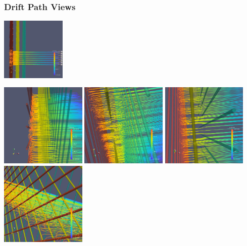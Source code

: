 \documentclass[xcolor=dvipsnames]{beamer}
\begin{document}
\begin{frame}
  \frametitle{Drift Path Views}
  \begin{center}
    
  \includegraphics[height=3cm,clip,trim=0cm 5cm 0cm 17cm]{steps/upaths1.png}

  \includegraphics[height=4cm,clip,trim=10cm 0cm 10cm 0cm]{steps/upaths8.png}
  \includegraphics[height=4cm,clip,trim=4cm 0cm 10cm 0cm]{steps/upaths7.png}
  \includegraphics[height=4cm,clip,trim=4cm 0cm 10cm 0cm]{steps/upaths6.png}
  \includegraphics[height=4cm,clip,trim=10cm 0cm 0cm 10cm]{steps/upaths5.png}
  \end{center}


\end{frame}
\end{document}
